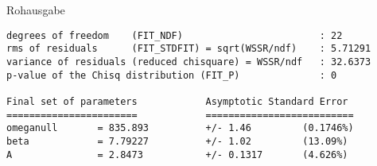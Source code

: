    \vspace{-\baselineskip}
    Rohausgabe
    \begin{verbatim}
degrees of freedom    (FIT_NDF)                        : 22
rms of residuals      (FIT_STDFIT) = sqrt(WSSR/ndf)    : 5.71291
variance of residuals (reduced chisquare) = WSSR/ndf   : 32.6373
p-value of the Chisq distribution (FIT_P)              : 0

Final set of parameters            Asymptotic Standard Error
=======================            ==========================
omeganull       = 835.893          +/- 1.46         (0.1746%)
beta            = 7.79227          +/- 1.02         (13.09%)
A               = 2.8473           +/- 0.1317       (4.626%)
    \end{verbatim}
